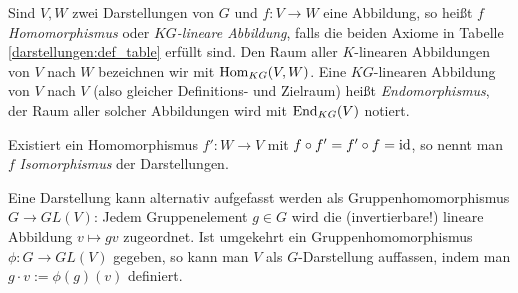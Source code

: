 \begin{definition}[Darstellungen]
Sind $V,W$ zwei Darstellungen von $G$ und $f: V\to W$ eine Abbildung, so heißt $f$ \emph{Homomorphismus} oder \emph{$KG$-lineare Abbildung}, falls die beiden Axiome in Tabelle \ref{darstellungen:def_table} erfüllt sind. Den Raum aller $K$-linearen Abbildungen von $V$ nach $W$ bezeichnen wir mit $\operatorname{Hom}_{KG}(V,W)$. Eine $KG$-linearen Abbildung von $V$ nach $V$ (also gleicher Definitions- und Zielraum) heißt \emph{Endomorphismus}, der Raum aller solcher Abbildungen wird mit $\operatorname{End}_{KG}(V)$ notiert.

Existiert ein Homomorphismus $f': W\to V$ mit $f\circ f'=f'\circ f=\operatorname{id}$, so nennt man $f$ \emph{Isomorphismus} der Darstellungen.
\end{definition}

\begin{remark}
Eine Darstellung kann alternativ aufgefasst werden als Gruppenhomomorphismus $G\to GL(V)$: Jedem Gruppenelement $g\in G$ wird die (invertierbare!) lineare Abbildung $v\mapsto gv$ zugeordnet. Ist umgekehrt ein Gruppenhomomorphismus $\phi: G\to GL(V)$ gegeben, so kann man $V$ als $G$-Darstellung auffassen, indem man $g\cdot v:=\phi(g)(v)$ definiert.
\end{remark}